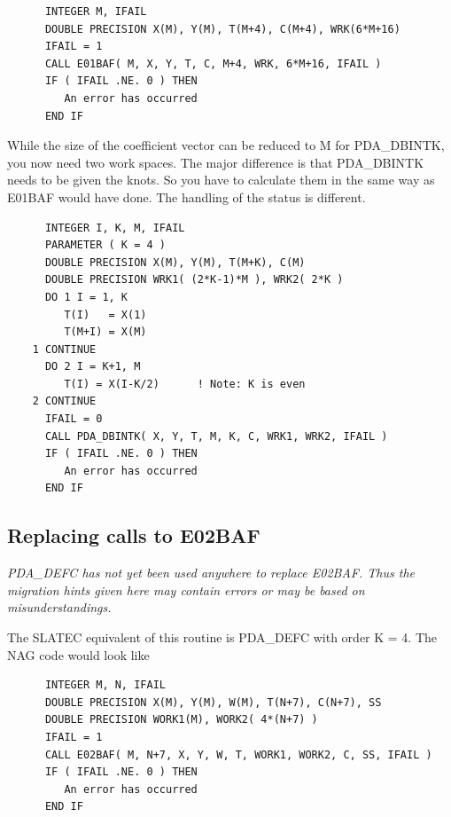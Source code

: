 \documentclass[11pt,twoside]{article}
\newcommand{\htmlref}[2]{#1}
\newcommand{\xlabel}[1]{}
\begin{document}
\begin{verbatim}
      INTEGER M, IFAIL
      DOUBLE PRECISION X(M), Y(M), T(M+4), C(M+4), WRK(6*M+16)
      IFAIL = 1
      CALL E01BAF( M, X, Y, T, C, M+4, WRK, 6*M+16, IFAIL )
      IF ( IFAIL .NE. 0 ) THEN
         An error has occurred
      END IF
\end{verbatim}

   While the size of the coefficient vector can be reduced to M for
   PDA\_DBINTK, you now need two work spaces.
   The major difference is that PDA\_DBINTK needs to be given the knots. So
   you have to calculate them in the same way as E01BAF would have done.
   The handling of the status is different.

\begin{verbatim}
      INTEGER I, K, M, IFAIL
      PARAMETER ( K = 4 )
      DOUBLE PRECISION X(M), Y(M), T(M+K), C(M)
      DOUBLE PRECISION WRK1( (2*K-1)*M ), WRK2( 2*K )
      DO 1 I = 1, K
         T(I)   = X(1)
         T(M+I) = X(M)
    1 CONTINUE
      DO 2 I = K+1, M
         T(I) = X(I-K/2)      ! Note: K is even
    2 CONTINUE
      IFAIL = 0
      CALL PDA_DBINTK( X, Y, T, M, K, C, WRK1, WRK2, IFAIL )
      IF ( IFAIL .NE. 0 ) THEN
         An error has occurred
      END IF
\end{verbatim}


\subsection{\xlabel{replacing_calls_to_e02baf}\label{m_e02baf}Replacing calls to E02BAF}

{\em 
   PDA\_DEFC has not yet been used anywhere to replace E02BAF. Thus the
   migration hints given here may contain errors or may be based on
   misunderstandings.
\/}

   The SLATEC equivalent of this routine is
\htmlref{PDA\_DEFC}{PDA\_DEFC}
   with order K = 4. The
   NAG code would look like

\begin{verbatim}
      INTEGER M, N, IFAIL
      DOUBLE PRECISION X(M), Y(M), W(M), T(N+7), C(N+7), SS
      DOUBLE PRECISION WORK1(M), WORK2( 4*(N+7) )
      IFAIL = 1
      CALL E02BAF( M, N+7, X, Y, W, T, WORK1, WORK2, C, SS, IFAIL )
      IF ( IFAIL .NE. 0 ) THEN
         An error has occurred
      END IF
\end{verbatim}
\end{document}
